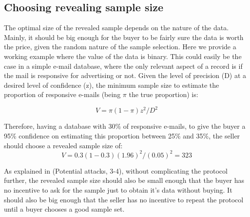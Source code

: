 \documentclass[]{article}
\begin{document}
\subsection{Choosing revealing sample size}
The optimal size of the revealed sample depends on the nature of the data. Mainly, it should be big enough for the buyer to be fairly sure the data is worth the price, given the random nature of the sample selection. Here we provide a working example where the value of the data is binary. This could easily be the case in a simple e-mail database, where the only relevant aspect of a record is if the mail is responsive for advertising or not.
Given the level of precision (D) at a desired level of confidence (z), the minimum sample size to estimate the proportion of responsive e-mails (being $\pi$ the true proportion) is:

\begin{equation}
V = \pi(1-\pi)z^2/D^2
\end{equation}   

Therefore, having a database with 30\% of responsive e-mails, to give the buyer a 95\% confidence on estimating this proportion between 25\% and 35\%, the seller should choose a revealed sample size of: 
\begin{equation}
V = 0.3(1-0.3)(1.96)^2/(0.05)^2 = 323
\end{equation}  

As explained in (Potential attacks, 3-4), without complicating the protocol further, the revealed sample size should also be small enough that the buyer has no incentive to ask for the sample just to obtain it's data without buying. It should also be big enough that the seller has no incentive to repeat the protocol until a buyer chooses a good sample set.


\end{document}

